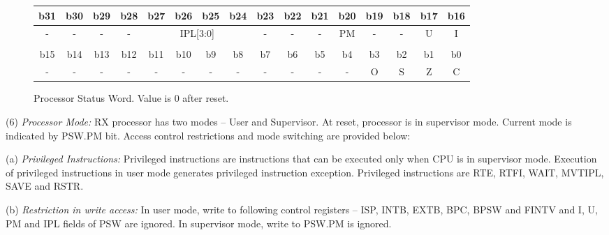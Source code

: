 \begin{figure}
\begin{center}
\scriptsize
\begin{tabular}{cccccccccccccccc}
b31 & b30 & b29 & b28 & b27 & b26 & b25 & b24 & b23 & b22 & b21 & b20 & b19 & b18 & b17 & b16 \\ \hline
\multicolumn{1}{|c}{-} &
\multicolumn{1}{|c}{-} &
\multicolumn{1}{|c}{-} &
\multicolumn{1}{|c}{-} &
\multicolumn{4}{|c}{IPL[3:0]} & 
\multicolumn{1}{|c}{-} &
\multicolumn{1}{|c}{-} &
\multicolumn{1}{|c}{-} &
\multicolumn{1}{|c}{PM} & 
\multicolumn{1}{|c}{-} &
\multicolumn{1}{|c}{-} &
\multicolumn{1}{|c}{U} &
\multicolumn{1}{|c|}{I} \\ \hline
&&&&&&&&&&&&&&& \\ 
b15 & b14 & b13 & b12 & b11 & b10 & b9 & b8 & b7 & b6 & b5 & b4 & b3 & b2 & b1 & b0 \\ \hline
\multicolumn{1}{|c}{-} &
\multicolumn{1}{|c}{-} &
\multicolumn{1}{|c}{-} &
\multicolumn{1}{|c}{-} &
\multicolumn{1}{|c}{-} &
\multicolumn{1}{|c}{-} &
\multicolumn{1}{|c}{-} &
\multicolumn{1}{|c}{-} &
\multicolumn{1}{|c}{-} &
\multicolumn{1}{|c}{-} &
\multicolumn{1}{|c}{-} &
\multicolumn{1}{|c}{-} &
\multicolumn{1}{|c}{O} &
\multicolumn{1}{|c}{S} &
\multicolumn{1}{|c}{Z} &
\multicolumn{1}{|c|}{C} \\ \hline
\end{tabular}
\end{center}
\captionsetup{font=scriptsize, labelfont=scriptsize}
\caption{Processor Status Word. Value is 0 after reset.}
\end{figure}

\levelone
(6) \emph{Processor Mode:} %
RX processor has two modes -- User and Supervisor. At reset, processor is in supervisor mode. Current 
mode is indicated by PSW.PM bit. Access control restrictions and mode switching are provided below:

    \leveltwo
    (a) \emph{Privileged Instructions:} %
    Privileged instructions are instructions that can be executed only when CPU is in supervisor 
    mode. Execution of privileged instructions in user mode generates privileged instruction 
    exception. Privileged instructions are RTE, RTFI, WAIT, MVTIPL, SAVE and RSTR.

    (b) \emph{Restriction in write access:} %
    In user mode, write to following control registers -- ISP, INTB, EXTB, BPC, BPSW and FINTV and 
    I, U, PM and IPL fields of PSW are ignored. In supervisor mode, write to PSW.PM is ignored.

